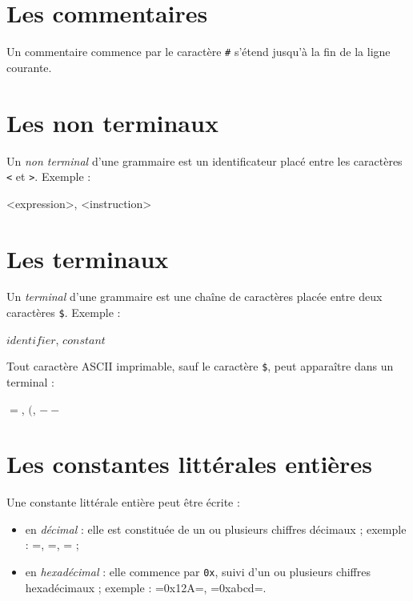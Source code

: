 \section{Les commentaires}

Un commentaire commence par le caractère \texttt{\#} s'étend jusqu'à la fin de la ligne courante.








\section{Les non terminaux}

Un \emph{non terminal} d'une grammaire est un identificateur placé entre les caractères \texttt{<} et \texttt{>}. Exemple :

\begin{galgas}
 <expression>, <instruction>
\end{galgas}







\section{Les terminaux}

Un \emph{terminal} d'une grammaire est une chaîne de caractères placée entre deux caractères \texttt{\$}. Exemple :

\begin{galgas}
 $identifier$, $constant$
\end{galgas}

Tout caractère ASCII imprimable, sauf le caractère \texttt{\$}, peut apparaître dans un terminal :
\begin{galgas}
 $=$, $($, $--$
\end{galgas}






\section{Les constantes littérales entières}

Une constante littérale entière peut être écrite :
\begin{itemize}
  \item en \emph{décimal} : elle est constituée de un ou plusieurs chiffres décimaux ; exemple : =, =, = ;
  \item en \emph{hexadécimal} : elle commence par \texttt{0x}, suivi d'un ou plusieurs chiffres hexadécimaux ; exemple : \ggs=0x12A=, \ggs=0xabcd=.
\end{itemize}

